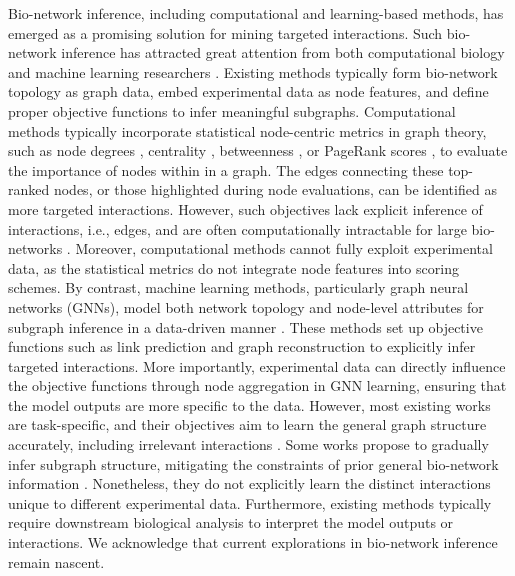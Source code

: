Bio-network inference, including computational and learning-based methods, has emerged as a promising solution for mining targeted interactions.
Such bio-network inference has attracted great attention from both computational biology and machine learning researchers \cite{wu2021gaerf,kang2022lr}. 
Existing methods typically form bio-network topology as graph data, embed experimental data as node features, and define proper objective functions to infer meaningful subgraphs.
Computational methods typically incorporate statistical node-centric metrics in graph theory, such as node degrees \cite{RSS,RSS1}, centrality \cite{MDS,MDS1}, betweenness \cite{NACHER201657}, or PageRank scores \cite{PMID:21149343,PPR1}, to evaluate the importance of nodes within in a graph.
The edges connecting these top-ranked nodes, or those highlighted during node evaluations, can be identified as more targeted interactions.
However, such objectives lack explicit inference of interactions, i.e., edges, and are often computationally intractable for large bio-networks \cite{BG_1}.
Moreover, computational methods cannot fully exploit experimental data, as the statistical metrics do not integrate node features into scoring schemes.
By contrast, machine learning methods, particularly graph neural networks (GNNs), model both network topology and node-level attributes for subgraph inference in a data-driven manner \cite{GNNS1, GNNS2}.
These methods set up objective functions such as link prediction and graph reconstruction to explicitly infer targeted interactions. 
More importantly, experimental data can directly influence the objective functions through node aggregation in GNN learning, ensuring that the model outputs are more specific to the data.
However, most existing works are task-specific, and their objectives aim to learn the general graph structure accurately, including irrelevant interactions \cite{wu2021gaerf, zhao2021csgnn}.
Some works propose to gradually infer subgraph structure, mitigating the constraints of prior general bio-network information \cite{kang2022lr,graph1}.
Nonetheless, they do not explicitly learn the distinct interactions unique to different experimental data.
Furthermore, existing methods typically require downstream biological analysis to interpret the model outputs or interactions.
We acknowledge that current explorations in bio-network inference remain nascent.

